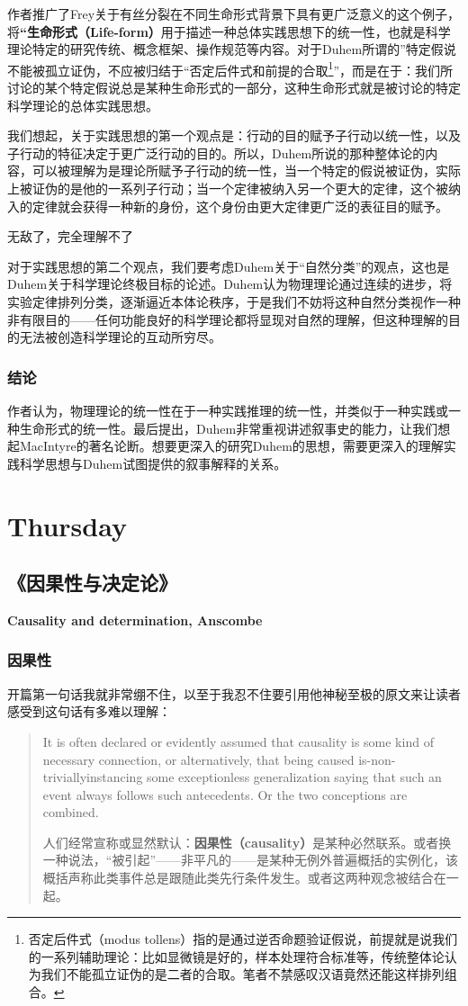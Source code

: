\documentclass[12pt, a4paper, oneside]{ctexart}
\renewcommand{\b}{\textbf}
\newcommand{\f}{\footnote}
\newcommand{\q}[1]{\begin{questionbox}{}#1\end{questionbox}}
\newcounter{question}[section]
\begin{document}
作者推广了Frey关于有丝分裂在不同生命形式背景下具有更广泛意义的这个例子，将\b{“生命形式（Life-form）}用于描述一种总体实践思想下的统一性，也就是科学理论特定的研究传统、概念框架、操作规范等内容。对于Duhem所谓的”特定假说不能被孤立证伪，不应被归结于“否定后件式和前提的合取\f{否定后件式（modus tollens）指的是通过逆否命题验证假说，前提就是说我们的一系列辅助理论：比如显微镜是好的，样本处理符合标准等，传统整体论认为我们不能孤立证伪的是二者的合取。笔者不禁感叹汉语竟然还能这样排列组合。}”，而是在于：我们所讨论的某个特定假说总是某种生命形式的一部分，这种生命形式就是被讨论的特定科学理论的总体实践思想。

我们想起，关于实践思想的第一个观点是：行动的目的赋予子行动以统一性，以及子行动的特征决定于更广泛行动的目的。所以，Duhem所说的那种整体论的内容，可以被理解为是理论所赋予子行动的统一性，当一个特定的假说被证伪，实际上被证伪的是他的一系列子行动；当一个定律被纳入另一个更大的定律，这个被纳入的定律就会获得一种新的身份，这个身份由更大定律更广泛的表征目的赋予。

\q{无敌了，完全理解不了}

对于实践思想的第二个观点，我们要考虑Duhem关于“自然分类”的观点，这也是Duhem关于科学理论终极目标的论述。Duhem认为物理理论通过连续的进步，将实验定律排列分类，逐渐逼近本体论秩序，于是我们不妨将这种自然分类视作一种非有限目的——任何功能良好的科学理论都将显现对自然的理解，但这种理解的目的无法被创造科学理论的互动所穷尽。

\subsubsection{结论}
作者认为，物理理论的统一性在于一种实践推理的统一性，并类似于一种实践或一种生命形式的统一性。最后提出，Duhem非常重视讲述叙事史的能力，让我们想起MacIntyre的著名论断。想要更深入的研究Duhem的思想，需要更深入的理解实践科学思想与Duhem试图提供的叙事解释的关系。

\section{Thursday}
\subsection{《因果性与决定论》}
\textbf{Causality and determination, Anscombe}
\subsubsection{因果性}
开篇第一句话我就非常绷不住，以至于我忍不住要引用他神秘至极的原文来让读者感受到这句话有多难以理解：
\begin{quote}\small
It is often declared or evidently assumed that causality is some kind of necessary connection, or alternatively, that being caused is-non-triviallyinstancing some exceptionless generalization saying that such an event always follows such antecedents. Or the two conceptions are combined. 

人们经常宣称或显然默认：\b{因果性（causality）}是某种必然联系。或者换一种说法，“被引起”——非平凡的——是某种无例外普遍概括的实例化，该概括声称此类事件总是跟随此类先行条件发生。或者这两种观念被结合在一起。
\end{quote}
\end{document}
